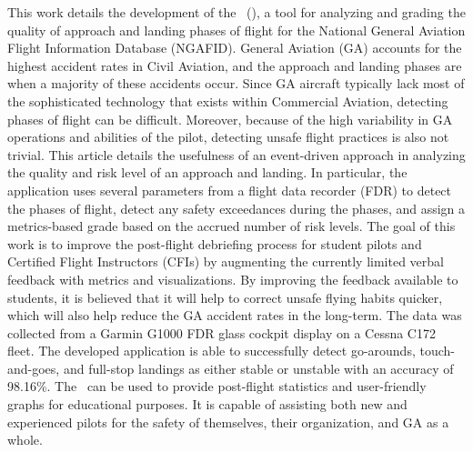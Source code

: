 
	This work details the development of the \toolname\ (\toolnameshort), a tool for analyzing and grading the quality of approach and landing phases of flight for the National General Aviation Flight Information Database (NGAFID).  General Aviation (GA) accounts for the highest accident rates in Civil Aviation, and the approach and landing phases are when a majority of these accidents occur.  Since GA aircraft typically lack most of the sophisticated technology that exists within Commercial Aviation, detecting phases of flight can be difficult.  Moreover, because of the high variability in GA operations and abilities of the pilot, detecting unsafe flight practices is also not trivial.  This article details the usefulness of an event-driven approach in analyzing the quality and risk level of an approach and landing.  In particular, the application uses several parameters from a flight data recorder (FDR) to detect the phases of flight, detect any safety exceedances during the phases, and assign a metrics-based grade based on the accrued number of risk levels.  The goal of this work is to improve the post-flight debriefing process for student pilots and Certified Flight Instructors (CFIs) by augmenting the currently limited verbal feedback with metrics and visualizations.  By improving the feedback available to students, it is believed that it will help to correct unsafe flying habits quicker, which will also help reduce the GA accident rates in the long-term.  The data was collected from a Garmin G1000 FDR glass cockpit display on a Cessna C172 fleet.  The developed application is able to successfully detect go-arounds, touch-and-goes, and full-stop landings as either stable or unstable with an accuracy of 98.16\%.  The \toolnameshort\ can be used to provide post-flight statistics and user-friendly graphs for educational purposes.  It is capable of assisting both new and experienced pilots for the safety of themselves, their organization, and GA as a whole.